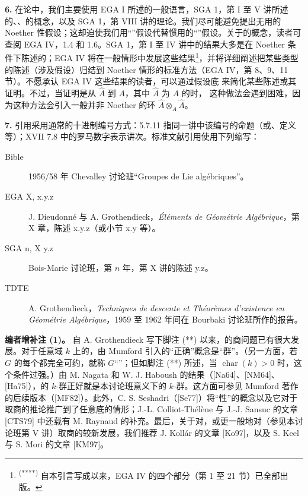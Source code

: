\textbf{6.} 在论中，我们主要使用 EGA I 所述的一般语言，SGA 1，第 I 至 V 讲所述的、、的概念，以及 SGA 1，第 VIII 讲的理论。我们尽可能避免提出无用的 Noether 性假设；这却迫使我们用“”假设代替惯用的“”假设。关于的概念，读者可查阅 EGA IV，1.4 和 1.6。SGA 1，第 I 至 IV 讲中的结果大多是在 Noether 条件下陈述的；EGA IV 将在一般情形中发展这些结果\footnote{\textsuperscript{(****)} 自本引言写成以来，EGA IV 的四个部分（第 1 至 21 节）已全部出版。}，并将详细阐述把某些类型的陈述（涉及假设）归结到 Noether 情形的标准方法（EGA IV，第 8、9、11 节）。不愿承认 EGA IV 这些结果的读者，可以通过假设底 来简化某些陈述或其证明。不过，当证明是从 $\widehat A$ 到 $A$，其中 $\widehat A$ 为  $A$ 的时，
这种做法会遇到困难，因为这种方法会引入一般并非 Noether 的环 $\widehat A\otimes_A\widehat A$。

\textbf{7.} 引用采用通常的十进制编号方式：5.7.11 指同一讲中该编号的命题（或、定义等）；XVII 7.8 中的罗马数字表示讲次。标准文献引用使用下列缩写：
\begin{description}
\item[Bible] 1956/58 年 Chevalley 讨论班“Groupes de Lie algébriques”。
\item[EGA X, x.y.z] J. Dieudonné 与 A. Grothendieck，\emph{Éléments de Géométrie Algébrique}，第 X 章，陈述 x.y.z（或小节 x.y 等）。
\item[SGA n, X y.z] Bois-Marie 讨论班，第 $n$ 年，第 X 讲的陈述 y.z。
\item[TDTE] A. Grothendieck，\emph{Techniques de descente et Théorèmes d'existence en Géométrie Algébrique}，1959 至 1962 年间在 Bourbaki 讨论班所作的报告。
\end{description}

\textbf{编者增补注 (1)。} 自 A. Grothendieck 写下脚注 (**) 以来，的商问题已有很大发展。对于任意域 $k$ 上的，由 Mumford 引入的“正确”概念是“群”。（另一方面，若 $G$ 的每个都完全可约，就称 $G$“”；但如脚注 (**) 所述，当 $\operatorname{char}(k)>0$ 时，这个条件过强。）由 M. Nagata 和 W. J. Haboush 的结果（[Na64]、[NM64]、[Ha75]），的 $k$-群正好就是本讨论班意义下的 $k$-群。这方面可参见 Mumford 著作的后续版本（[MF82]）。此外，C. S. Seshadri（[Se77]）将“性”的概念以及它对于取商的推论推广到了任意底的情形；J.-L. Colliot-Thélène 与 J.-J. Sansuc 的文章 [CTS79] 中还载有 M. Raynaud 的补充。最后，关于对，或更一般地对（参见本讨论班第 V 讲）取商的较新发展，我们推荐 J. Kollár 的文章 [Ko97]，以及 S. Keel 与 S. Mori 的文章 [KM97]。

